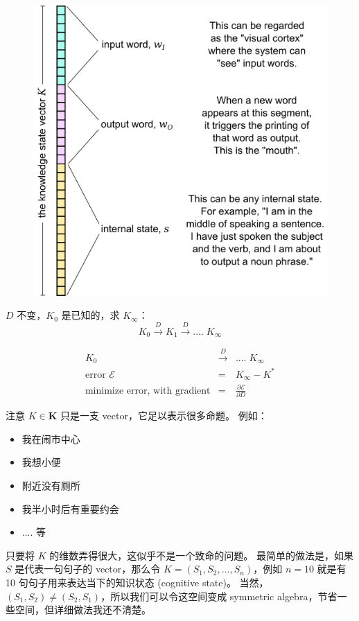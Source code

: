\documentclass[12pt]{article}
\begin{document}
\begin{figure}[H]
\centering
\includegraphics[scale=0.4]{internal-state-K.png}
\end{figure}

$D$ 不变，$K_0$ 是已知的，求 $K_\infty$：
$$ K_0 \stackrel{D}{\longrightarrow} K_1 \stackrel{D}{\longrightarrow} .... \; K_\infty $$

\begin{eqnarray}
K_0 & \stackrel{D}{\longrightarrow} & .... \; K_\infty \nonumber \\
\mbox{error } \mathcal{E} & = & K_\infty - K^* \nonumber \\
\mbox{minimize error, with gradient} & = & \frac{\partial \mathcal{E}}{\partial D} \nonumber
\end{eqnarray}

注意 $K \in \mathbf{K}$ 只是一支 vector，它足以表示很多命题。 例如：
\begin{itemize}
\item 我在闹市中心
\item 我想小便
\item 附近没有厕所
\item 我半小时后有重要约会
\item .... 等
\end{itemize}
只要将 $K$ 的维数弄得很大，这似乎不是一个致命的问题。 最简单的做法是，如果 $S$ 是代表一句句子的 vector，那么令 $K = (S_1, S_2, ..., S_n)$，例如 $n=10$ 就是有 10 句句子用来表达当下的知识状态 (cognitive state)。 当然，$(S_1,S_2) \neq (S_2,S_1)$，所以我们可以令这空间变成 symmetric algebra，节省一些空间，但详细做法我还不清楚。
\end{document}
